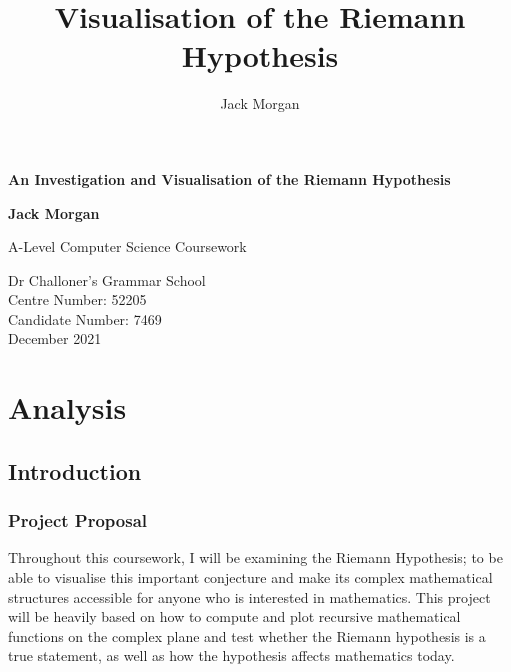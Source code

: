 \documentclass{article}
\author{Jack Morgan}
\title{Visualisation of the Riemann Hypothesis}
\begin{document}
\begin{titlepage}
    \begin{center}
    \vspace*{1cm}

    \Huge
    \textbf{An Investigation and Visualisation of the Riemann Hypothesis}

    \vspace{0.5cm}
    \LARGE
    \vspace{1.5cm}

    \textbf{Jack Morgan}

    \vfill

    A-Level Computer Science Coursework\\

    \vspace{2cm}

    \Large
    Dr Challoner's Grammar School\\
    Centre Number: 52205\\
    Candidate Number: 7469\\
    December 2021\\

    \vspace{1cm}

    \end{center}
\end{titlepage}


\section{Analysis}

\subsection{Introduction}

\subsubsection{Project Proposal}

Throughout this coursework, I will be examining the Riemann Hypothesis; to be able to visualise this important conjecture and make its complex mathematical structures accessible for anyone who is interested in mathematics. This project will be heavily based on how to compute and plot recursive mathematical functions on the complex plane and test whether the Riemann hypothesis is a true statement, as well as how the hypothesis affects mathematics today.
\end{document}
